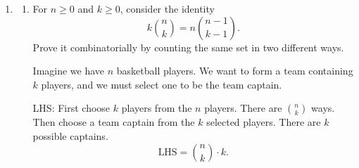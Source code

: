 \documentclass{article}
\begin{document}
\begin{enumerate}
\begin{enumerate}
  \item
  \[
  a_1 + a_2 + a_3 + a_4 + a_5 + a_6 = 30,
  \]
  where
  \[
  0 \leq a_i \leq 7
  \quad \text{for all } 1 \leq i \leq 6.
  \]

  Use Inclusion-Exclusion to subtract the solutions where at least one variable is greater than or equal to 8.

  No restrictions, using Stars and Bars:

  \[
  \binom{35}{5}
  \]
  solutions.

  Let $A_i$ be the set of solutions where $a_i\geq8$.

  If one variable is at least 8, we assign 8 to that variable, leaving $30-8=22$.
  There are $\binom{6}{1}$ ways to select the variable:

  \[
  \binom{6}{1}\binom{22+5}{5}
  = \binom{6}{1}\binom{27}{5}
  \]

  Now if two variables are at least 8 we are left with $30-16=14$.
  There are $\binom{6}{2}$ ways:
  \[
  \binom{6}{2}\binom{14+5}{5}
  =\binom{6}{2}\binom{19}{5}.
  \]

  Moving on to if three variable are at least 8 we are left with $30-24=6$.
  There are $\binom{6}{3}$ ways:
   \[
  \binom{6}{3}\binom{6+5}{5}
  =\binom{6}{3}\binom{11}{5}.
  \]

  This is the max case because if four variables are at least 8 we get  $4 \cdot 8 = 32 > 30$.

  Therefore the number of valid solutions is given by:

  \[
  \boxed{
  \binom{35}{5}
  -\binom{6}{1}\binom{27}{5}
  +\binom{6}{2}\binom{19}{5}
  -\binom{6}{3}\binom{11}{5}
  }.
  \]
\end{enumerate}

\item
\begin{enumerate}

\item For $n \geq 0$ and $k \geq 0$, consider the identity
\[
k\binom{n}{k} = n\binom{n-1}{k-1}.
\]
Prove it combinatorially by counting the same set in two different ways.

Imagine we have $n$ basketball players.
We want to form a team containing $k$ players, and we must select one to be the team captain.

LHS:
First choose $k$ players from the $n$ players. There are $\binom{n}{k}$ ways.
Then choose a team captain from the $k$ selected players. There are $k$ possible captains.
\[
\text{LHS} = \binom{n}{k} \cdot k.
\]


\end{enumerate}
\end{enumerate}
\end{document}
